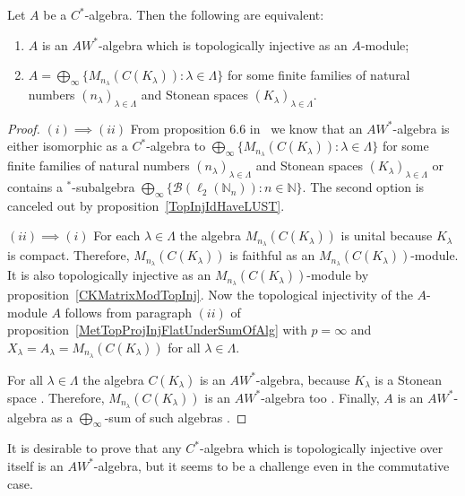 \begin{theorem}\label{TopInjAWStarAlgCharac} Let $A$ be a $C^*$-algebra. Then
the following are equivalent:

\begin{enumerate}[label = (\roman*)]
    \item $A$ is an $AW^*$-algebra which is topologically injective 
    as an $A$-module;

    \item $A
    =\bigoplus_\infty \{M_{n_\lambda}(C(K_\lambda)):\lambda\in\Lambda \}$
    for some finite families of natural 
    numbers ${(n_\lambda)}_{\lambda\in\Lambda}$ and Stonean 
    spaces ${(K_\lambda)}_{\lambda\in\Lambda}$.
\end{enumerate}
\end{theorem}
\begin{proof}$(i)\implies (ii)$ From proposition 6.6
in~\cite{SmithDecompPropCStarAlg} we know that an $AW^*$-algebra is either
isomorphic as a $C^*$-algebra 
to  $\bigoplus_\infty \{M_{n_\lambda}(C(K_\lambda)):\lambda\in\Lambda \}$ 
for some finite families of natural numbers ${(n_\lambda)}_{\lambda\in\Lambda}$ 
and Stonean spaces ${(K_\lambda)}_{\lambda\in\Lambda}$ or contains 
a ${}^*$-subalgebra 
$\bigoplus_\infty \{ \mathcal{B}(\ell_2(\mathbb{N}_n)):n\in\mathbb{N} \}$. The
second option is canceled out by proposition~\ref{TopInjIdHaveLUST}.

$(ii)\implies (i)$ For each $\lambda\in\Lambda$ the algebra
$M_{n_\lambda}(C(K_\lambda))$ is unital because $K_\lambda$ is compact.
Therefore, $M_{n_\lambda}(C(K_\lambda))$ is faithful as an
$M_{n_\lambda}(C(K_\lambda))$-module. It is also topologically injective as an
$M_{n_\lambda}(C(K_\lambda))$-module by proposition~\ref{CKMatrixModTopInj}.
Now the topological injectivity of the $A$-module $A$ follows from paragraph
$(ii)$ of proposition~\ref{MetTopProjInjFlatUnderSumOfAlg} with $p=\infty$ and
$X_\lambda=A_\lambda=M_{n_\lambda}(C(K_\lambda))$ for all $\lambda\in\Lambda$. 

For all $\lambda\in\Lambda$ the algebra $C(K_\lambda)$ is an $AW^*$-algebra,
because $K_\lambda$ is a Stonean space \cite[theorem 1.7.1]{BerbBaerStarRings}. Therefore, $M_{n_\lambda}(C(K_\lambda))$ is an $AW^*$-algebra too
\cite[corollary 9.62.1]{BerbBaerStarRings}. Finally, $A$ is an $AW^*$-algebra
as a $\bigoplus_\infty$-sum of such algebras \cite[proposition 1.10.1]{BerbBaerStarRings}.
\end{proof}

It is desirable to prove that any $C^*$-algebra which is topologically injective 
over itself is an $AW^*$-algebra, but it seems to be a challenge even in the
commutative case.

